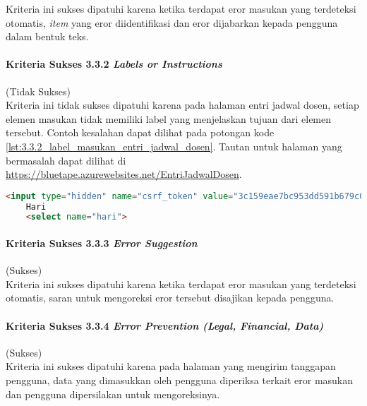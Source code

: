 Kriteria ini sukses dipatuhi karena ketika terdapat eror masukan yang terdeteksi otomatis, \textit{item} yang eror diidentifikasi dan eror dijabarkan kepada pengguna dalam bentuk teks.

\paragraph{Kriteria Sukses 3.3.2 \textit{Labels or Instructions}}
\label{par:kepatuhan_bluetape_kriteria_sukses_3.3.2}
(Tidak Sukses)\\

Kriteria ini tidak sukses dipatuhi karena pada halaman entri jadwal dosen, setiap elemen masukan tidak memiliki label yang menjelaskan tujuan dari elemen tersebut. Contoh kesalahan dapat dilihat pada potongan kode \ref{lst:3.3.2_label_masukan_entri_jadwal_dosen}. Tautan untuk halaman yang bermasalah dapat dilihat di \url{https://bluetape.azurewebsites.net/EntriJadwalDosen}.

\begin{lstlisting}[frame=single, label={lst:3.3.2_label_masukan_entri_jadwal_dosen}, language=HTML, caption=Kriteria Sukses 3.3.2 - Tidak Terdapat Label pada Kolom Masukan di Halaman Entri Jadwal Dosen]
    <input type="hidden" name="csrf_token" value="3c159eae7bc953dd591b679c080ed066"/>
    Hari
    <select name="hari">
\end{lstlisting}

\paragraph{Kriteria Sukses 3.3.3 \textit{Error Suggestion}}
\label{par:kepatuhan_bluetape_kriteria_sukses_3.3.3}
(Sukses)\\

Kriteria ini sukses dipatuhi karena ketika terdapat eror masukan yang terdeteksi otomatis, saran untuk mengoreksi eror tersebut disajikan kepada pengguna.

\paragraph{Kriteria Sukses 3.3.4 \textit{Error Prevention (Legal, Financial, Data)\\}}
\label{par:kepatuhan_bluetape_kriteria_sukses_3.3.4}
(Sukses)\\

Kriteria ini sukses dipatuhi karena pada halaman yang mengirim tanggapan pengguna, data yang dimasukkan oleh pengguna diperiksa terkait eror masukan dan pengguna dipersilakan untuk mengoreksinya.

